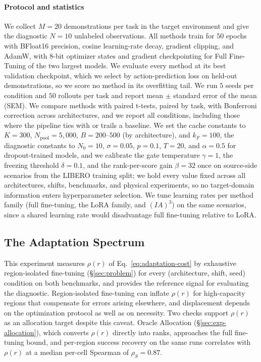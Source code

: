 \paragraph{Protocol and statistics}
We collect $M = 20$ demonstrations per task in the target environment and give the diagnostic $N = 10$ unlabeled observations.
All methods train for $50$ epochs with BFloat16 precision, cosine learning-rate decay, gradient clipping, and AdamW, with 8-bit optimizer states and gradient checkpointing for Full Fine-Tuning of the two largest models.
We evaluate every method at its best validation checkpoint, which we select by action-prediction loss on held-out demonstrations, so we score no method in its overfitting tail.
We run $5$ seeds per condition and $50$ rollouts per task and report mean $\pm$ standard error of the mean (SEM).
We compare methods with paired t-tests, paired by task, with Bonferroni correction across architectures, and we report all conditions, including those where the pipeline ties with or trails a baseline.
We set the cache constants to $K = 300$, $N_\text{pool} = 5{,}000$, $B = 200$--$500$ (by architecture), and $k_F = 100$, the diagnostic constants to $N_0 = 10$, $\sigma = 0.05$, $p = 0.1$, $T = 20$, and $\alpha = 0.5$ for dropout-trained models, and we calibrate the gate temperature $\gamma = 1$, the freezing threshold $\delta = 0.1$, and the rank-per-score gain $\beta = 32$ once on source-side scenarios from the LIBERO training split; we hold every value fixed across all architectures, shifts, benchmarks, and physical experiments, so no target-domain information enters hyperparameter selection.
We tune learning rates per method family (full fine-tuning, the LoRA family, and $(IA)^3$) on the same scenarios, since a shared learning rate would disadvantage full fine-tuning relative to LoRA.

\subsection{The Adaptation Spectrum}
\label{sec:exp-spectrum}

This experiment measures $\rho(r)$ of Eq.~\ref{eq:adaptation-cost} by exhaustive region-isolated fine-tuning (\S\ref{sec:problem}) for every (architecture, shift, seed) condition on both benchmarks, and provides the reference signal for evaluating the diagnostic.
Region-isolated fine-tuning can inflate $\rho(r)$ for high-capacity regions that compensate for errors arising elsewhere, and displacement depends on the optimization protocol as well as on necessity.
Two checks support $\rho(r)$ as an allocation target despite this caveat.
Oracle Allocation (\S\ref{sec:exp-allocation}), which converts $\rho(r)$ directly into ranks, approaches the full fine-tuning bound, and per-region success recovery on the same runs correlates with $\rho(r)$ at a median per-cell Spearman of $\rho_S = 0.87$.

